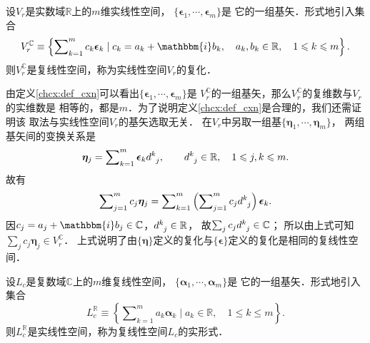 
  
\begin{definition}\label{chcx:def_cxn}
    设$V_r$是实数域$\mathbb{R}$上的$m$维实线性空间，
    $\{\boldsymbol{\epsilon}_1,\cdots,\boldsymbol{\epsilon}_m\}$是
    它的一组基矢．形式地引入集合
    \begin{equation}\label{chcx:eqn_cxn}
        V^{\mathbb{C}}_r \equiv \left\{ \sum\nolimits_{k=1}^{m} c_k \boldsymbol{\epsilon}_k \mid
        c_k = a_k+\mathbbm{i} b_k,\quad a_k,b_k \in \mathbb{R},
        \quad 1\leqslant k \leqslant m \right\} .
    \end{equation}
    则$V^{\mathbb{C}}_r$是复线性空间，称为实线性空间$V_r$的{\heiti 复化}．
\end{definition}

由定义\ref{chcx:def_cxn}可以看出$\{\boldsymbol{\epsilon}_1,\cdots,\boldsymbol{\epsilon}_m\}$是
$V^{\mathbb{C}}_r$的一组基矢，那么$V^{\mathbb{C}}_r$的{\kaishu 复维数}与$V_r$的{\kaishu 实维数}是
相等的，都是$m$．为了说明定义\ref{chcx:def_cxn}是合理的，我们还需证明该
取法与实线性空间$V_r$的基矢选取无关．
在$V_r$中另取一组基$\{\boldsymbol{\eta}_1,\cdots,\boldsymbol{\eta}_m\}$，
两组基矢间的变换关系是
\begin{equation}
    \boldsymbol{\eta}_j = \sum\nolimits_{k=1}^{m} \boldsymbol{\epsilon}_k d^k_{\hphantom{k}j},\qquad
    d^k_{\hphantom{k}j} \in \mathbb{R},\quad 1\leqslant j,k \leqslant m .
\end{equation}
故有
\begin{equation}
    \sum\nolimits_{j=1}^{m} c_j \boldsymbol{\eta}_j = \sum\nolimits_{k=1}^{m}
    \left( \sum\nolimits_{j=1}^{m} c_j d^k_{\hphantom{k}j} \right)\boldsymbol{\epsilon}_k .
\end{equation}
因$c_j= a_j+\mathbbm{i} b_j\in \mathbb{C}$，$d^k_{\hphantom{k}j} \in \mathbb{R}$，
故$\sum_{j} c_j d^k_{\hphantom{k}j} \in \mathbb{C}$；
所以由上式可知$\sum_{j} c_j \boldsymbol{\eta}_j \in V^{\mathbb{C}}_r$．
上式说明了由$\{\boldsymbol{\eta}\}$定义的复化与$\{\boldsymbol{\epsilon}\}$定义的复化是相同的复线性空间．


\begin{definition}\label{chcx:def_real}
    设$L_c$是复数域$\mathbb{C}$上的$m$维复线性空间，
    $\{\boldsymbol{\alpha}_1,\cdots,\boldsymbol{\alpha}_m\}$是
    它的一组基矢．形式地引入集合
    \begin{equation}
        L^{\mathbb{R}}_c \equiv \left\{ \sum\nolimits_{k=1}^{m} a_k \boldsymbol{\alpha}_k \mid
        a_k \in \mathbb{R},     \quad 1\leqslant  k \leqslant m \right\} .
    \end{equation}
    则$L^{\mathbb{R}}_c$是实线性空间，称为复线性空间$L_c$的{\heiti 实形式}．
\end{definition}

